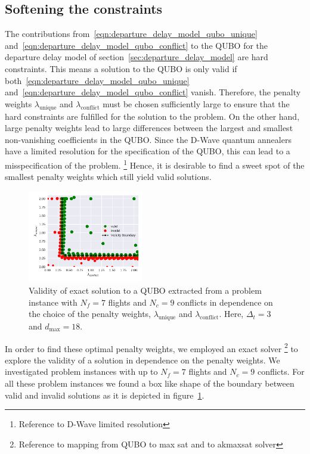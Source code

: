 \subsection{Softening the constraints}
The contributions from~\eqref{eqn:departure_delay_model_qubo_unique} and~\eqref{eqn:departure_delay_model_qubo_conflict} to the QUBO for the departure delay model of section~\ref{sec:departure_delay_model} are hard constraints.
This means a solution to the QUBO is only valid if both~\eqref{eqn:departure_delay_model_qubo_unique} and~\eqref{eqn:departure_delay_model_qubo_conflict} vanish.
Therefore, the penalty weights $\lambda_\text{unique}$ and $\lambda_\text{conflict}$ must be chosen sufficiently large to ensure that the hard constraints are fulfilled for the solution to the problem.
On the other hand, large penalty weights lead to large differences between the largest and smallest non-vanishing coefficients in the QUBO.\@
Since the D-Wave quantum annealers have a limited resolution for the specification of the QUBO, this can lead to a misspecification of the problem.
\footnote{Reference to D-Wave limited resolution}
Hence, it is desirable to find a sweet spot of the smallest penalty weights which still yield valid solutions.

\begin{figure}[htpb]
    \centering
    \includegraphics[width=0.45\textwidth]{./pics/validity_boundary_example.pdf}
    \caption{Validity of exact solution to a QUBO extracted from a problem instance with $N_f=7$ flights and $N_c=9$ conflicts in dependence on the choice of the penalty weights, $\lambda_\text{unique}$ and $\lambda_\text{conflict}$. Here, $\Delta_t=3$ and $d_\text{max}=18$.}
    \label{fig:penalty_weights}
\end{figure}

In order to find these optimal penalty weights, we employed an exact solver
\footnote{Reference to mapping from QUBO to max sat and to akmaxsat solver} to explore the validity of a solution in dependence on the penalty weights.
We investigated problem instances with up to $N_f=7$ flights and $N_c=9$ conflicts.
For all these problem instances we found a box like shape of the boundary between valid and invalid solutions as it is depicted in figure~\ref{fig:penalty_weights}.

